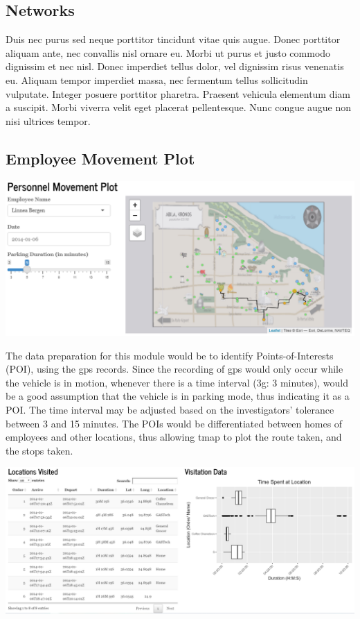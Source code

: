 \documentclass{acm_proc_article-sp}
\begin{document}
\hypertarget{networks}{%
\subsection{Networks}\label{networks}}

Duis nec purus sed neque porttitor tincidunt vitae quis augue. Donec
porttitor aliquam ante, nec convallis nisl ornare eu. Morbi ut purus et
justo commodo dignissim et nec nisl. Donec imperdiet tellus dolor, vel
dignissim risus venenatis eu. Aliquam tempor imperdiet massa, nec
fermentum tellus sollicitudin vulputate. Integer posuere porttitor
pharetra. Praesent vehicula elementum diam a suscipit. Morbi viverra
velit eget placerat pellentesque. Nunc congue augue non nisi ultrices
tempor.

\hypertarget{employee-movement-plot}{%
\subsection{Employee Movement Plot}\label{employee-movement-plot}}

\includegraphics{img/Movement.PNG}

The data preparation for this module would be to identify
Points-of-Interests (POI), using the gps records. Since the recording of
gps would only occur while the vehicle is in motion, whenever there is a
time interval (3g: 3 minutes), would be a good assumption that the
vehicle is in parking mode, thus indicating it as a POI. The time
interval may be adjusted based on the investigators' tolerance between 3
and 15 minutes. The POIs would be differentiated between homes of
employees and other locations, thus allowing tmap to plot the route
taken, and the stops taken.

\includegraphics{img/Movement2.PNG}
\end{document}
